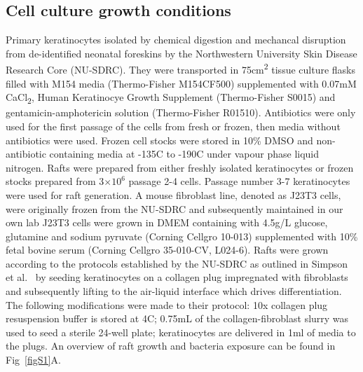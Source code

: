 \documentclass[10pt,letterpaper]{article}
\providecommand{\e}[1]{\ensuremath{\times 10^{#1}}}
\begin{document}
\subsection*{Cell culture growth conditions}
Primary keratinocytes isolated by chemical digestion and mechancal disruption from de-identified neonatal foreskins by the Northwestern University Skin Disease Research Core (NU-SDRC).
They were transported in 75cm\textsuperscript{2} tissue culture flasks filled with M154 media (Thermo-Fisher M154CF500) supplemented with 0.07mM CaCl\textsubscript{2}, Human Keratinocye Growth Supplement (Thermo-Fisher S0015) and gentamicin-amphotericin solution (Thermo-Fisher R01510).
Antibiotics were only used for the first passage of the cells from fresh or frozen, then media without antibiotics were used.
Frozen cell stocks were stored in 10\% DMSO and non-antibiotic containing media at -135\degree C to -190\degree C under vapour phase liquid nitrogen.
Rafts were prepared from either freshly isolated keratinocytes or frozen stocks prepared from 3\e6 passage 2-4 cells.
Passage number 3-7 keratinocytes were used for raft generation.
A mouse fibroblast line, denoted as J23T3 cells, were originally frozen from the NU-SDRC and subsequently maintained in our own lab 
J23T3 cells were grown in DMEM containing with 4.5g/L glucose, glutamine and sodium pyruvate (Corning Cellgro 10-013) supplemented with 10\% fetal bovine serum (Corning Cellgro 35-010-CV, L024-6).
Rafts were grown according to the protocols established by the NU-SDRC as outlined in Simpson et al.~\cite{simpson_rna_2010} by seeding keratinocytes on a collagen plug impregnated with fibroblasts and subsequently lifting to the air-liquid interface which drives differentiation.
The following modifications were made to their protocol:
10x collagen plug resuspension buffer is stored at 4\degree C;
0.75mL of the collagen-fibroblast slurry was used to seed a sterile 24-well plate;
keratinocytes are delivered in 1ml of media to the plugs.
An overview of raft growth and bacteria exposure can be found in Fig~\ref{figS1}A.
\end{document}
